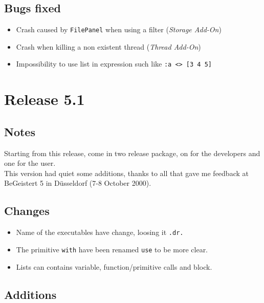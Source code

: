 \subsection{Bugs fixed}

\begin{itemize}
\item Crash caused by {\tt FilePanel} when using a filter ({\em Storage Add-On})
\item Crash when killing a non existent thread ({\em Thread Add-On})
\item Impossibility to use list in expression such like {\tt :a <> [3 4 5]}
\end{itemize}

\section{Release 5.1}

\subsection{Notes}

Starting from this release, \squirrel come in two release package, on for the developers and one for the user.\\

This version had quiet some additions, thanks to all that gave me feedback at BeGeistert 5 in D\"usseldorf (7-8 October 2000).

\subsection{Changes}

\begin{itemize}
\item Name of the executables have change, loosing it {\tt .dr.}
\item The primitive {\tt with} have been renamed {\tt use} to be more clear.
\item Lists can contains variable, function/primitive calls and block.
\end{itemize}

\subsection{Additions}

